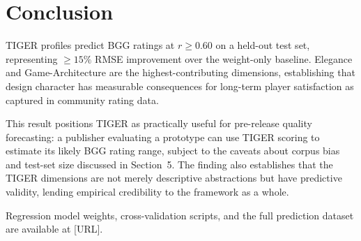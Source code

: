 \section{Conclusion}
\label{sec:conclusion}

TIGER profiles predict BGG ratings at $r \geq 0.60$ on a held-out test set, representing
$\geq 15\%$ RMSE improvement over the weight-only baseline. Elegance and Game-Architecture
are the highest-contributing dimensions, establishing that design character has measurable
consequences for long-term player satisfaction as captured in community rating data.

This result positions TIGER as practically useful for pre-release quality forecasting:
a publisher evaluating a prototype can use TIGER scoring to estimate its likely BGG rating
range, subject to the caveats about corpus bias and test-set size discussed in Section~5.
The finding also establishes that the TIGER dimensions are not merely descriptive
abstractions but have predictive validity, lending empirical credibility to the framework
as a whole.

Regression model weights, cross-validation scripts, and the full prediction dataset are
available at [URL].
